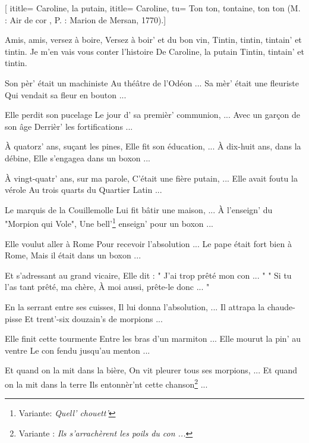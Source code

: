  [
ititle= {Caroline, la putain},
ititle= {Caroline},
tu= {Ton ton, tontaine, ton ton (M. : Air de cor , P. : Marion de Mersan, 1770).}]


\beginverse
Amis, amis, versez à boire,
Versez à boir' et du bon vin,
Tintin, tintin, tintain' et tintin.
Je m'en vais vous conter l'histoire
De Caroline, la putain
Tintin, tintain' et tintin.
\endverse

\beginverse
Son pèr' était un machiniste
Au théâtre de l'Odéon ...
Sa mèr' était une fleuriste
Qui vendait sa fleur en bouton ...
\endverse

\beginverse
Elle perdit son pucelage
Le jour d' sa premièr' communion, ...
Avec un garçon de son âge
Derrièr' les fortifications ...
\endverse

\beginverse
À quatorz' ans, suçant les pines,
Elle fit son éducation, ...
À dix-huit ans, dans la débine,
Elle s'engagea dans un boxon ...
\endverse

\beginverse
À vingt-quatr' ans, sur ma parole,
C'était une fière putain, ...
Elle avait foutu la vérole
Au trois quarts du Quartier Latin ...
\endverse

\beginverse
Le marquis de la Couillemolle
Lui fit bâtir une maison, ...
À l'enseign' du "Morpion qui Vole",
Une bell'\footnote {Variante: \emph{Quell' chouett'}} enseign' pour un boxon ...
\endverse

\beginverse
Elle voulut aller à Rome
Pour recevoir l'absolution ...
Le pape était fort bien à Rome,
Mais il était dans un boxon ...
\endverse

\beginverse
Et s'adressant au grand vicaire,
Elle dit : " J'ai trop prêté mon con ... "
" Si tu l'as tant prêté, ma chère,
À moi aussi, prête-le donc ... "
\endverse

\beginverse
En la serrant entre ses cuisses,
Il lui donna l'absolution, ...
Il attrapa la chaude-pisse
Et trent'-six douzain's de morpions ...
\endverse

\beginverse
Elle finit cette tourmente
Entre les bras d'un marmiton ...
Elle mourut la pin' au ventre
Le con fendu jusqu'au menton ...
\endverse

\beginverse
Et quand on la mit dans la bière,
On vit pleurer tous ses morpions, ...
Et quand on la mit dans la terre
Ils entonnèr'nt cette chanson\footnote{Variante : \emph{Ils s'arrachèrent les poils du con ...}} ...
\endverse

\endsong
